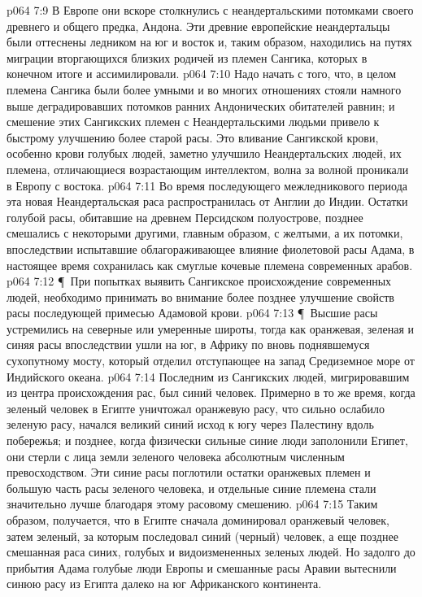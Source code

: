 \vs p064 7:9 В Европе они вскоре столкнулись с неандертальскими потомками своего древнего и общего предка, Андона. Эти древние европейские неандертальцы были оттеснены ледником на юг и восток и, таким образом, находились на путях миграции вторгающихся близких родичей из племен Сангика, которых в конечном итоге и ассимилировали.
\vs p064 7:10 Надо начать с того, что, в целом племена Сангика были более умными и во многих отношениях стояли намного выше деградировавших потомков ранних Андонических обитателей равнин; и смешение этих Сангикских племен с Неандертальскими людьми привело к быстрому улучшению более старой расы. Это вливание Сангикской крови, особенно крови голубых людей, заметно улучшило Неандертальских людей, их племена, отличающиеся возрастающим интеллектом, волна за волной проникали в Европу с востока.
\vs p064 7:11 Во время последующего межледникового периода эта новая Неандертальская раса распространилась от Англии до Индии. Остатки голубой расы, обитавшие на древнем Персидском полуострове, позднее смешались с некоторыми другими, главным образом, с желтыми, а их потомки, впоследствии испытавшие облагораживающее влияние фиолетовой расы Адама, в настоящее время сохранилась как смуглые кочевые племена современных арабов.
\vs p064 7:12 \P\ При попытках выявить Сангикское происхождение современных людей, необходимо принимать во внимание более позднее улучшение свойств расы последующей примесью Адамовой крови.
\vs p064 7:13 \P\ Высшие расы устремились на северные или умеренные широты, тогда как оранжевая, зеленая и синяя расы впоследствии ушли на юг, в Африку по вновь поднявшемуся сухопутному мосту, который отделил отступающее на запад Средиземное море от Индийского океана.
\vs p064 7:14 Последним из Сангикских людей, мигрировавшим из центра происхождения рас, был синий человек. Примерно в то же время, когда зеленый человек в Египте уничтожал оранжевую расу, что сильно ослабило зеленую расу, начался великий синий исход к югу через Палестину вдоль побережья; и позднее, когда физически сильные синие люди заполонили Египет, они стерли с лица земли зеленого человека абсолютным численным превосходством. Эти синие расы поглотили остатки оранжевых племен и большую часть расы зеленого человека, и отдельные синие племена стали значительно лучше благодаря этому расовому смешению.
\vs p064 7:15 Таким образом, получается, что в Египте сначала доминировал оранжевый человек, затем зеленый, за которым последовал синий (черный) человек, а еще позднее смешанная раса синих, голубых и видоизмененных зеленых людей. Но задолго до прибытия Адама голубые люди Европы и смешанные расы Аравии вытеснили синюю расу из Египта далеко на юг Африканского континента.
